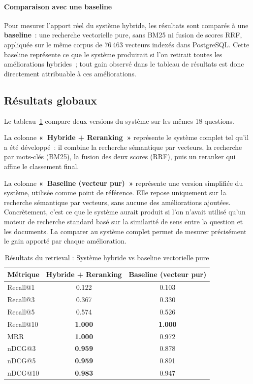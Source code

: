 \paragraph{Comparaison avec une baseline}
Pour mesurer l'apport réel du système hybride, les résultats sont comparés à une \textbf{baseline}~: une recherche vectorielle pure, sans BM25 ni fusion de scores RRF, appliquée sur le même corpus de 76\,463 vecteurs indexés dans PostgreSQL. Cette baseline représente ce que le système produirait si l'on retirait toutes les améliorations hybrides~; tout gain observé dans le tableau de résultats est donc directement attribuable à ces améliorations.

\subsection{Résultats globaux}

Le tableau~\ref{tab:retrieval-results} compare deux versions du système sur les mêmes 18 questions.

La colonne \textbf{«~Hybride + Reranking~»} représente le système complet tel qu'il a été développé~: il combine la recherche sémantique par vecteurs, la recherche par mots-clés (BM25), la fusion des deux scores (RRF), puis un reranker qui affine le classement final.

La colonne \textbf{«~Baseline (vecteur pur)~»} représente une version simplifiée du système, utilisée comme point de référence. Elle repose uniquement sur la recherche sémantique par vecteurs, sans aucune des améliorations ajoutées. Concrètement, c'est ce que le système aurait produit si l'on n'avait utilisé qu'un moteur de recherche standard basé sur la similarité de sens entre la question et les documents. La comparer au système complet permet de mesurer précisément le gain apporté par chaque amélioration.

\begin{table}[H]
\centering
\caption{Résultats du retrieval : Système hybride vs baseline vectorielle pure}
\label{tab:retrieval-results}
\begin{tabular}{|l|c|c|}
\hline
\textbf{Métrique} & \textbf{Hybride + Reranking} & \textbf{Baseline (vecteur pur)} \\
\hline
Recall@1  & 0.122 & 0.103 \\
\hline
Recall@3  & 0.367 & 0.330 \\
\hline
Recall@5  & 0.574 & 0.526 \\
\hline
Recall@10 & \textbf{1.000} & \textbf{1.000} \\
\hline
MRR       & \textbf{1.000} & 0.972 \\
\hline
nDCG@3    & \textbf{0.959} & 0.878 \\
\hline
nDCG@5    & \textbf{0.959} & 0.891 \\
\hline
nDCG@10   & \textbf{0.983} & 0.947 \\
\hline
\end{tabular}
\end{table}

